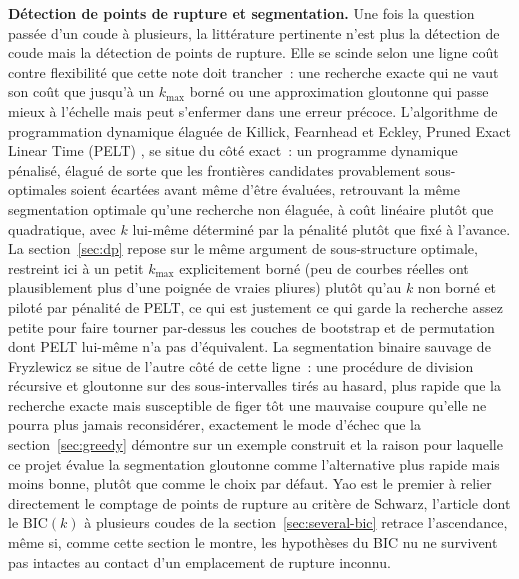 \documentclass[11pt]{article}
\begin{document}
\textbf{Détection de points de rupture et segmentation.} Une fois la
question passée d'un coude à plusieurs, la littérature pertinente n'est
plus la détection de coude mais la détection de points de rupture. Elle
se scinde selon une ligne coût contre flexibilité que cette note doit
trancher~: une recherche exacte qui ne vaut son coût que jusqu'à un
$k_{\max}$ borné ou une approximation gloutonne qui passe mieux à
l'échelle mais peut s'enfermer dans une erreur précoce. L'algorithme de
programmation dynamique élaguée de Killick, Fearnhead et Eckley, Pruned
Exact Linear Time (PELT) \citep{killick2012}, se situe du côté exact~:
un programme dynamique pénalisé, élagué de sorte que les frontières
candidates provablement sous-optimales soient écartées avant même d'être
évaluées, retrouvant la même segmentation optimale qu'une recherche non
élaguée, à coût linéaire plutôt que quadratique, avec $k$ lui-même
déterminé par la pénalité plutôt que fixé à l'avance. La
section~\ref{sec:dp} repose sur le même argument de sous-structure
optimale, restreint ici à un petit $k_{\max}$ explicitement borné (peu de
courbes réelles ont plausiblement plus d'une poignée de vraies pliures)
plutôt qu'au $k$ non borné et piloté par pénalité de PELT, ce qui est
justement ce qui garde la recherche assez petite pour faire tourner
par-dessus les couches de bootstrap et de permutation dont PELT lui-même
n'a pas d'équivalent. La segmentation binaire sauvage de Fryzlewicz
\citep{fryzlewicz2014} se situe de l'autre côté de cette ligne~: une
procédure de division récursive et gloutonne sur des sous-intervalles
tirés au hasard, plus rapide que la recherche exacte mais susceptible de
figer tôt une mauvaise coupure qu'elle ne pourra plus jamais reconsidérer,
exactement le mode d'échec que la section~\ref{sec:greedy} démontre sur
un exemple construit et la raison pour laquelle ce projet évalue la
segmentation gloutonne comme l'alternative plus rapide mais moins bonne,
plutôt que comme le choix par défaut. Yao \citep{yao1988} est le premier
à relier directement le comptage de points de rupture au critère de
Schwarz, l'article dont le $\mathrm{BIC}(k)$ à plusieurs coudes de la
section~\ref{sec:several-bic} retrace l'ascendance, même si, comme cette
section le montre, les hypothèses du BIC nu ne survivent pas intactes au
contact d'un emplacement de rupture inconnu.
\end{document}
